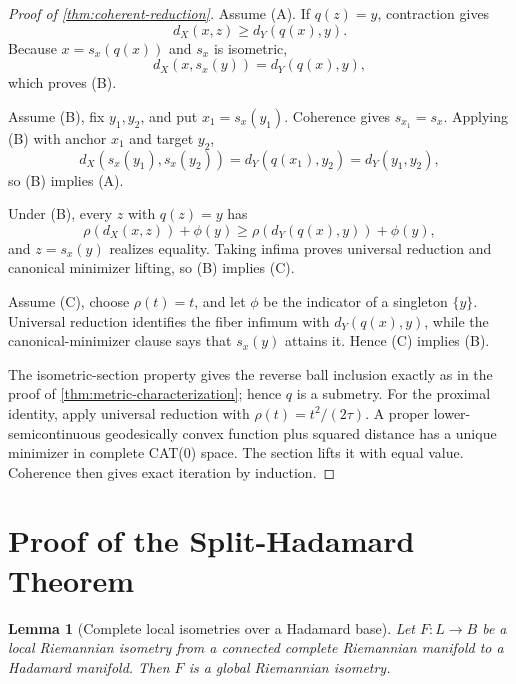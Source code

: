 \documentclass[10pt]{article}
\theoremstyle{plain}
\newtheorem{lemma}[theorem]{Lemma}
\theoremstyle{definition}
\theoremstyle{remark}
\begin{document}
\begin{proof}[Proof of \cref{thm:coherent-reduction}]
Assume (A).  If \(q(z)=y\), contraction gives
\[
  d_X(x,z)\ge d_Y(q(x),y).
\]
Because \(x=s_x(q(x))\) and \(s_x\) is isometric,
\[
  d_X(x,s_x(y))=d_Y(q(x),y),
\]
which proves (B).

Assume (B), fix \(y_1,y_2\), and put \(x_1=s_x(y_1)\).  Coherence gives
\(s_{x_1}=s_x\).  Applying (B) with anchor \(x_1\) and target \(y_2\),
\[
  d_X(s_x(y_1),s_x(y_2))
  =d_Y(q(x_1),y_2)=d_Y(y_1,y_2),
\]
so (B) implies (A).

Under (B), every \(z\) with \(q(z)=y\) has
\[
  \rho(d_X(x,z))+\phi(y)
  \ge \rho(d_Y(q(x),y))+\phi(y),
\]
and \(z=s_x(y)\) realizes equality.  Taking infima proves universal
reduction and canonical minimizer lifting, so (B) implies (C).

Assume (C), choose \(\rho(t)=t\), and let \(\phi\) be the indicator of a
singleton \(\{y\}\).  Universal reduction identifies the fiber infimum with
\(d_Y(q(x),y)\), while the canonical-minimizer clause says that \(s_x(y)\)
attains it.  Hence (C) implies (B).

The isometric-section property gives the reverse ball inclusion exactly as in
the proof of \cref{thm:metric-characterization}; hence \(q\) is a submetry.
For the proximal identity, apply universal reduction with
\(\rho(t)=t^2/(2\tau)\).  A proper lower-semicontinuous geodesically convex
function plus squared distance has a unique minimizer in complete CAT(0)
space.  The section lifts it with equal value.  Coherence then gives exact
iteration by induction.
\end{proof}

\section{Proof of the Split-Hadamard Theorem}
\label{app:split-proofs}

\begin{lemma}[Complete local isometries over a Hadamard base]
\label{lem:complete-local-isometry}
Let \(F:L\to B\) be a local Riemannian isometry from a connected complete
Riemannian manifold to a Hadamard manifold.  Then \(F\) is a global
Riemannian isometry.
\end{lemma}
\end{document}
